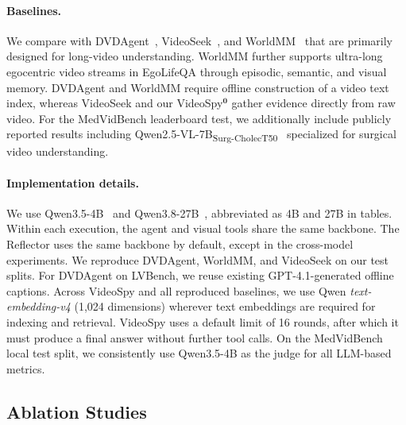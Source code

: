 \documentclass{article} %
\begin{document}
\VideoSpySetupTable

\paragraph{Baselines.}
We compare with DVDAgent~\citep{zhang2025dvd}, VideoSeek~\citep{lin2026videoseek}, and WorldMM~\citep{yeo2026worldmm} that are primarily designed for long-video understanding. WorldMM further supports ultra-long egocentric video streams in EgoLifeQA through episodic, semantic, and visual memory. DVDAgent and WorldMM require offline construction of a video text index, whereas VideoSeek and our VideoSpy$^{\mathbf{0}}$ gather evidence directly from raw video. For the MedVidBench leaderboard test, we additionally include publicly reported results including Qwen2.5-VL-7B\textsubscript{Surg-CholecT50}~\citep{nvidia2025qwen25vlsurg} specialized for surgical video understanding.

\paragraph{Implementation details.}
We use Qwen3.5-4B~\citep{qwenteam2026qwen35} and Qwen3.8-27B~\citep{qwenteam2026qwen38}, abbreviated as 4B and 27B in tables. Within each execution, the agent and visual tools share the same backbone. The Reflector uses the same backbone by default, except in the cross-model experiments. We reproduce DVDAgent, WorldMM, and VideoSeek on our test splits. For DVDAgent on LVBench, we reuse existing GPT-4.1-generated offline captions. Across VideoSpy and all reproduced baselines, we use Qwen \textit{text-embedding-v4} (1,024 dimensions) wherever text embeddings are required for indexing and retrieval. VideoSpy uses a default limit of 16 rounds, after which it must produce a final answer without further tool calls. On the MedVidBench local test split, we consistently use Qwen3.5-4B as the judge for all LLM-based metrics.

\subsection{Ablation Studies}
\label{sec:ablations}

\end{document}
